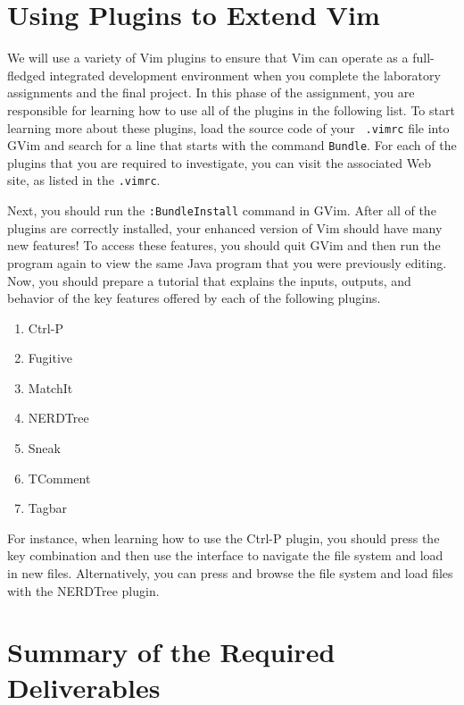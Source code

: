 \section*{Using Plugins to Extend Vim}

We will use a variety of Vim plugins to ensure that Vim can operate as a full-fledged integrated development environment when you
complete the laboratory assignments and the final project.  In this phase of the assignment, you are responsible for learning how
to use all of the plugins in the following list.  To start learning more about these plugins, load the source code of your {\tt
  .vimrc} file into GVim and search for a line that starts with the command {\tt Bundle}.  For each of the plugins that you
are required to investigate, you can visit the associated Web site, as listed in the {\tt .vimrc}. 

Next, you should run the {\tt :BundleInstall} command in GVim.  After all of the plugins are correctly installed, your enhanced
version of Vim should have many new features! To access these features, you should quit GVim and then run the program again to
view the same Java program that you were previously editing.  Now, you should prepare a tutorial that explains the inputs,
outputs, and behavior of the key features offered by each of the following plugins.

\begin{enumerate}

  \item Ctrl-P 
  \item Fugitive
  \item MatchIt
  \item NERDTree
  \item Sneak
  \item TComment
  \item Tagbar

\end{enumerate}

For instance, when learning how to use the Ctrl-P plugin, you should press the key combination {\tt <ctrl-p>} and then use the
interface to navigate the file system and load in new files.  Alternatively, you can press {\tt <F11>} and browse the file system
and load files with the NERDTree plugin.

\section*{Summary of the Required Deliverables}

